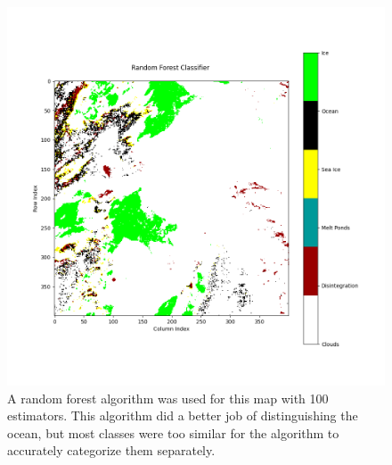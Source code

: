 \documentclass{homework}
\begin{document}
\begin{figure}
    \centering
    \includegraphics[width=\textwidth]{images/RandomForest.png}
    \caption{A random forest algorithm was used for this map with 100 estimators. This algorithm did a better job of distinguishing the ocean, but most classes were too similar for the algorithm to accurately categorize them separately.}
    \label{fig:Linear}
\end{figure}
\end{document}
